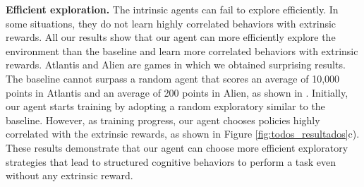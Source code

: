 \textbf{Efficient exploration.} The intrinsic agents can fail to explore efficiently. In some situations, they do not learn highly correlated behaviors with extrinsic rewards. All our results show that our agent can more efficiently explore the environment than the baseline and learn more correlated behaviors with extrinsic rewards. Atlantis and Alien are games in which we obtained surprising results. The baseline cannot surpass a random agent that scores an average of 10,000 points in Atlantis and an average of 200 points in Alien, as shown in \cite{burda2018large}. Initially, our agent starts training by adopting a random exploratory similar to the baseline. However, as training progress, our agent chooses policies highly correlated with the extrinsic rewards, as shown in Figure \ref{fig:todos_resultados}c). These results demonstrate that our agent can choose more efficient exploratory strategies that lead to structured cognitive behaviors to perform a task even without any extrinsic reward.